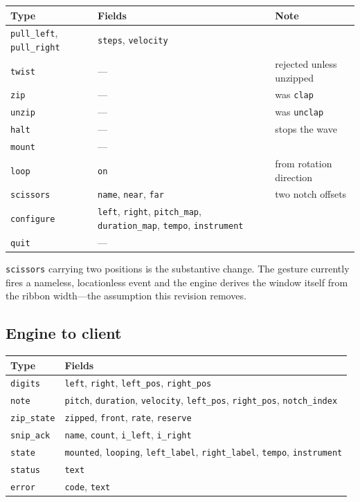 \documentclass[11pt,a4paper]{article}
\theoremstyle{definition}
\theoremstyle{plain}
\theoremstyle{remark}
\begin{document}
\begin{center}
\begin{tabular}{l>{\raggedright\arraybackslash}p{4.6cm}l}
\toprule
\textbf{Type} & \textbf{Fields} & \textbf{Note} \\
\midrule
\texttt{pull\_left}, \texttt{pull\_right} & \texttt{steps}, \texttt{velocity} & \\
\texttt{twist}     & --- & rejected unless unzipped \\
\texttt{zip}       & --- & was \texttt{clap} \\
\texttt{unzip}     & --- & was \texttt{unclap} \\
\texttt{halt}      & --- & stops the wave \\
\texttt{mount}     & --- & \\
\texttt{loop}      & \texttt{on} & from rotation direction \\
\texttt{scissors}  & \texttt{name}, \texttt{near}, \texttt{far} & two notch offsets \\
\texttt{configure} & \texttt{left}, \texttt{right}, \texttt{pitch\_map},
                     \texttt{duration\_map}, \texttt{tempo}, \texttt{instrument} & \\
\texttt{quit}      & --- & \\
\bottomrule
\end{tabular}
\end{center}

\texttt{scissors} carrying two positions is the substantive change. The gesture currently fires a
nameless, locationless event and the engine derives the window itself from the ribbon width---the
assumption this revision removes.

\subsection{Engine to client}

\begin{center}
\begin{tabular}{ll}
\toprule
\textbf{Type} & \textbf{Fields} \\
\midrule
\texttt{digits}    & \texttt{left}, \texttt{right}, \texttt{left\_pos}, \texttt{right\_pos} \\
\texttt{note}      & \texttt{pitch}, \texttt{duration}, \texttt{velocity},
                     \texttt{left\_pos}, \texttt{right\_pos}, \texttt{notch\_index} \\
\texttt{zip\_state}& \texttt{zipped}, \texttt{front}, \texttt{rate}, \texttt{reserve} \\
\texttt{snip\_ack} & \texttt{name}, \texttt{count}, \texttt{i\_left}, \texttt{i\_right} \\
\texttt{state}     & \texttt{mounted}, \texttt{looping}, \texttt{left\_label},
                     \texttt{right\_label}, \texttt{tempo}, \texttt{instrument} \\
\texttt{status}    & \texttt{text} \\
\texttt{error}     & \texttt{code}, \texttt{text} \\
\bottomrule
\end{tabular}
\end{center}
\end{document}
